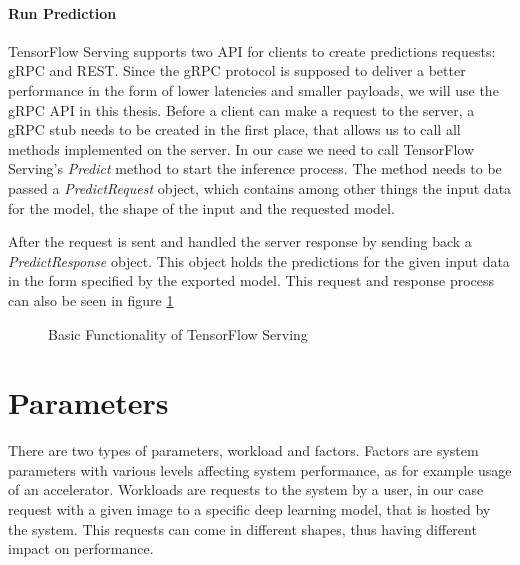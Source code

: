 \paragraph{Run Prediction}
TensorFlow Serving supports two API for clients to create predictions requests: gRPC and REST. Since the gRPC protocol is supposed to deliver a better performance in the form of lower latencies and smaller payloads, we will use the gRPC API in this thesis.
Before a client can make a request to the server, a gRPC stub needs to be created in the first place, that allows us to call all methods implemented on the server. In our case we need to call TensorFlow Serving's \emph{Predict} method to start the inference process. The method needs to be passed a \emph{PredictRequest} object, which contains among other things the input data for the model, the shape of the input and the requested model.%

After the request is sent and handled the server response by sending back a \emph{PredictResponse} object. This object holds the predictions for the given input data in the form specified by the exported model.
This request and response process can also be seen in figure \ref{fig:cloud}

\begin{figure}[H]
\centering

\caption{Basic Functionality of TensorFlow Serving}
\label{fig:cloud}
\end{figure}
 




\section{Parameters}
\label{chap:parameters}
There are two types of parameters, workload and factors.
Factors are system parameters with various levels affecting system performance, as for example usage of an accelerator.
Workloads are requests to the system by a user, in our case request with a given image to a specific deep learning model, that is hosted by the system.
This requests can come in different shapes, thus having different impact
on performance.
